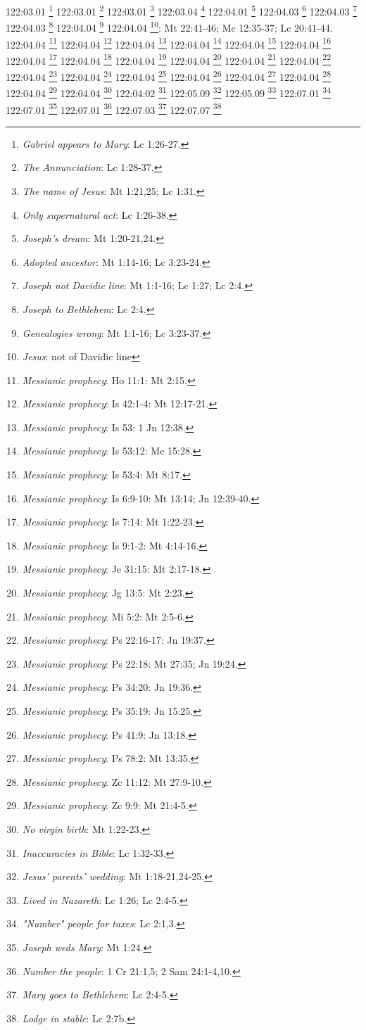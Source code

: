 {{{{{{{{{{{{{{{122:03.01 \footnote{\textit{Gabriel appears to Mary}: Lc 1:26-27.}
122:03.01 \footnote{\textit{The Annunciation}: Lc 1:28-37.}
122:03.01 \footnote{\textit{The name of Jesus}: Mt 1:21,25; Lc 1:31.}
122:03.04 \footnote{\textit{Only supernatural act}: Lc 1:26-38.}
122:04.01 \footnote{\textit{Joseph's dream}: Mt 1:20-21,24.}
122:04.03 \footnote{\textit{Adopted ancestor}: Mt 1:14-16; Lc 3:23-24.}
122:04.03 \footnote{\textit{Joseph not Davidic line}: Mt 1:1-16; Lc 1:27; Lc 2:4.}
122:04.03 \footnote{\textit{Joseph to Bethlehem}: Lc 2:4.}
122:04.04 \footnote{\textit{Genealogies wrong}: Mt 1:1-16; Lc 3:23-37.}
122:04.04 \footnote{\textit{Jesus}: not of Davidic line}: Mt 22:41-46; Mc 12:35-37; Lc 20:41-44.}
122:04.04 \footnote{\textit{Messianic prophecy}: Ho 11:1: Mt 2:15.}
122:04.04 \footnote{\textit{Messianic prophecy}: Is 42:1-4: Mt 12:17-21.}
122:04.04 \footnote{\textit{Messianic prophecy}: Is 53: 1 Jn 12:38.}
122:04.04 \footnote{\textit{Messianic prophecy}: Is 53:12: Mc 15:28.}
122:04.04 \footnote{\textit{Messianic prophecy}: Is 53:4: Mt 8:17.}
122:04.04 \footnote{\textit{Messianic prophecy}: Is 6:9-10: Mt 13:14; Jn 12:39-40.}
122:04.04 \footnote{\textit{Messianic prophecy}: Is 7:14: Mt 1:22-23.}
122:04.04 \footnote{\textit{Messianic prophecy}: Is 9:1-2: Mt 4:14-16.}
122:04.04 \footnote{\textit{Messianic prophecy}: Je 31:15: Mt 2:17-18.}
122:04.04 \footnote{\textit{Messianic prophecy}: Jg 13:5: Mt 2:23.}
122:04.04 \footnote{\textit{Messianic prophecy}: Mi 5:2: Mt 2:5-6.}
122:04.04 \footnote{\textit{Messianic prophecy}: Ps 22:16-17: Jn 19:37.}
122:04.04 \footnote{\textit{Messianic prophecy}: Ps 22:18: Mt 27:35; Jn 19:24.}
122:04.04 \footnote{\textit{Messianic prophecy}: Ps 34:20: Jn 19:36.}
122:04.04 \footnote{\textit{Messianic prophecy}: Ps 35:19: Jn 15:25.}
122:04.04 \footnote{\textit{Messianic prophecy}: Ps 41:9: Jn 13:18.}
122:04.04 \footnote{\textit{Messianic prophecy}: Ps 78:2: Mt 13:35.}
122:04.04 \footnote{\textit{Messianic prophecy}: Zc 11:12: Mt 27:9-10.}
122:04.04 \footnote{\textit{Messianic prophecy}: Zc 9:9: Mt 21:4-5.}
122:04.04 \footnote{\textit{No virgin birth}: Mt 1:22-23.}
122:04:02 \footnote{\textit{Inaccuracies in Bible}: Lc 1:32-33.}
122:05.09 \footnote{\textit{Jesus' parents' wedding}: Mt 1:18-21,24-25.}
122:05.09 \footnote{\textit{Lived in Nazareth}: Lc 1:26; Lc 2:4-5.}
122:07.01 \footnote{\textit{"Number" people for taxes}: Lc 2:1,3.}
122:07.01 \footnote{\textit{Joseph weds Mary}: Mt 1:24.}
122:07.01 \footnote{\textit{Number the people}: 1 Cr 21:1,5; 2 Sam 24:1-4,10.}
122:07.03 \footnote{\textit{Mary goes to Bethlehem}: Lc 2:4-5.}
122:07.07 \footnote{\textit{Lodge in stable}: Lc 2:7b.}
}}}}}}}}}}}}}}
